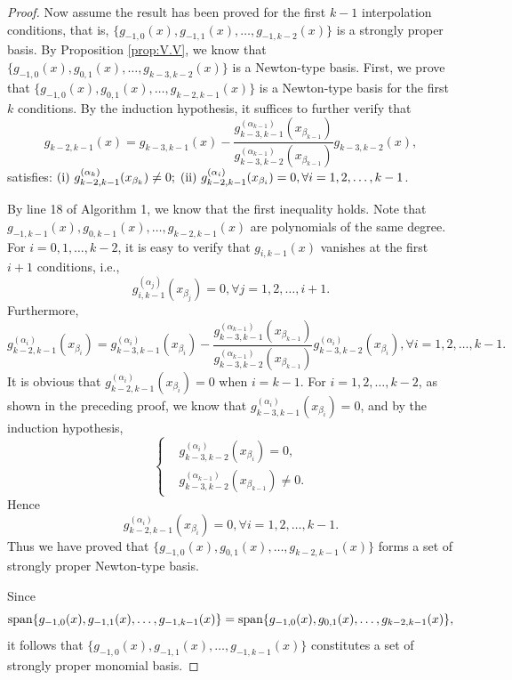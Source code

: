 \documentclass[preprint,12pt]{elsarticle}
\begin{document}
\begin{proof}
Now assume the result has been proved for the first  $k-1$ interpolation conditions, that is,
$\{g_{-1,0}(x), g_{-1,1}(x), \dots, g_{-1,k-2}(x)\}$ is a strongly proper basis. By Proposition \ref{prop:V.V}, we know that $\{g_{-1,0}(x), g_{0,1}(x), \dots, g_{k-3,k-2}(x)\}$ is a Newton-type basis. 
First, we prove that $\{g_{-1,0}(x), g_{0,1}(x), \dots, g_{k-2,k-1}(x)\}$ is a Newton-type basis for the first $k$ conditions. By the induction hypothesis, it suffices to further verify that 
\begin{displaymath}
  g_{k-2,k-1}(x)=g_{k-3,k-1}(x)-\frac{g_{k-3,k-1}^{(\alpha_{k-1})}(x_{\beta_{k-1}})}{g_{k-3,k-2}^{(\alpha_{k-1})}(x_{\beta_{k-1}})}g_{k-3,k-2}(x) , 
\end{displaymath}
 satisfies: 
$\textup{(\romannumeral 1) }g_{k-2,k-1}^{(\alpha_k)}(x_{\beta_k})\neq 0;$ 
$\textup{(\romannumeral 2) }g_{k-2,k-1}^{(\alpha_i)}(x_{\beta_i})=0, \forall i=1,2,\dots,k-1$.

By line 18 of Algorithm 1, we know that the first inequality holds.
Note that $g_{-1,k-1}(x), g_{0,k-1}(x), \dots, g_{k-2,k-1}(x)$ are polynomials of the same degree. 
For $i=0,1,\dots,k-2$, it is easy to verify that $g_{i,k-1}(x)$ vanishes at the first $i+1$ conditions, i.e.,
\begin{displaymath}
    g_{i,k-1}^{(\alpha_j)}(x_{\beta_j})=0, \forall j=1,2,\dots,i+1.
\end{displaymath}
Furthermore, 
\begin{displaymath}
    g_{k-2,k-1}^{(\alpha_i)}(x_{\beta_i})=g_{k-3,k-1}^{(\alpha_i)}(x_{\beta_i})-\frac{g_{k-3,k-1}^{(\alpha_{k-1})}(x_{\beta_{k-1}})}{g_{k-3,k-2}^{(\alpha_{k-1})}(x_{\beta_{k-1}})}g_{k-3,k-2}^{(\alpha_i)}(x_{\beta_i}),  \forall i=1,2,\dots,k-1.
\end{displaymath}
It is obvious that $g_{k-2,k-1}^{(\alpha_i)}(x_{\beta_i})=0$ when $i=k-1$. For $i=1,2,\dots,k-2$, as shown in the preceding proof, we know that 
$g_{k-3,k-1}^{(\alpha_i)}(x_{\beta_i})=0$, and by the induction hypothesis, \[
\left\{
\begin{aligned}
&g_{k-3,k-2}^{(\alpha_i)}(x_{\beta_i})=0, \\
&g_{k-3,k-2}^{(\alpha_{k-1})}(x_{\beta_{k-1}})\neq 0.
\end{aligned}
\right.
\] 
Hence
\begin{displaymath}
    g_{k-2,k-1}^{(\alpha_i)}(x_{\beta_i})=0, \forall i=1,2,\dots,k-1.
\end{displaymath} Thus we have proved that $\{g_{-1,0}(x), g_{0,1}(x), \dots, g_{k-2,k-1}(x)\}$ forms a set of strongly proper Newton-type basis.

Since $$\textup{span}\{g_{-1,0}(x), g_{-1,1}(x), \dots, g_{-1,k-1}(x)\}=\textup{span}\{g_{-1,0}(x),g_{0,1}(x),\dots,g_{k-2,k-1}(x)\},$$ 
it follows that
$\{g_{-1,0}(x), g_{-1,1}(x), \dots, g_{-1,k-1}(x)\}$ constitutes a set of strongly proper monomial basis.
\end{proof}
\end{document}
